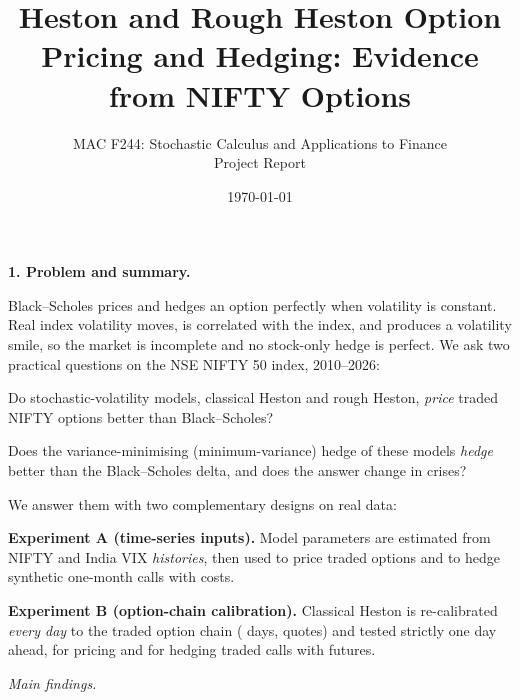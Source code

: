 \documentclass[10pt,leqno]{amsart}
\newcommand{\heading}[1]{\medskip\noindent\textbf{#1}\par}
\begin{document}
\title[Heston and Rough Heston Hedging on NIFTY]{Heston and Rough Heston Option Pricing and Hedging: Evidence from NIFTY Options}
\author{MAC F244: Stochastic Calculus and Applications to Finance \\ Project Report}
\date{\today}
\maketitle
\vspace{-1.5em}

\let\thefootnote\relax
{}

\bigskip

\heading{1. Problem and summary.}
\noindent Black--Scholes prices and hedges an option perfectly when volatility is constant. Real index volatility moves, is correlated with the index, and produces a volatility smile, so the market is incomplete and no stock-only hedge is perfect. We ask two practical questions on the NSE NIFTY 50 index, 2010--2026:
\begin{compactenum}
\item Do stochastic-volatility models, classical Heston and rough Heston, \emph{price} traded NIFTY options better than Black--Scholes?
\item Does the variance-minimising (minimum-variance) hedge of these models \emph{hedge} better than the Black--Scholes delta, and does the answer change in crises?
\end{compactenum}
We answer them with two complementary designs on real data:
\begin{compactitem}
\item \textbf{Experiment A (time-series inputs).} Model parameters are estimated from NIFTY and India VIX \emph{histories}, then used to price traded options and to hedge synthetic one-month calls with costs.
\item \textbf{Experiment B (option-chain calibration).} Classical Heston is re-calibrated \emph{every day} to the traded option chain (\NDays{} days, \NQuotes{} quotes) and tested strictly one day ahead, for pricing and for hedging traded calls with futures.
\end{compactitem}
\emph{Main findings.}
\end{document}
